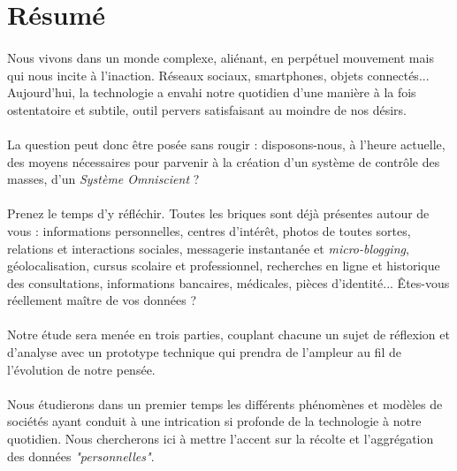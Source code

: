 \section*{Résumé}

\paragraph{} Nous vivons dans un monde complexe, aliénant, en perpétuel mouvement mais qui
nous incite à l'inaction. Réseaux sociaux, smartphones, objets connectés... Aujourd'hui, la
technologie a envahi notre quotidien d'une manière à la fois ostentatoire et subtile, outil
pervers satisfaisant au moindre de nos désirs.

\paragraph{} La question peut donc être posée sans rougir : disposons-nous, à l'heure
actuelle, des moyens nécessaires pour parvenir à la création d'un système de contrôle des
masses, d'un \emph{Système Omniscient} ?

\paragraph{} Prenez le temps d'y réfléchir. Toutes les briques sont déjà présentes autour
de vous : informations personnelles, centres d'intérêt, photos de toutes sortes, relations
et interactions sociales, messagerie instantanée et \emph{micro-blogging}, géolocalisation,
cursus scolaire et professionnel, recherches en ligne et historique des consultations,
informations bancaires, médicales, pièces d'identité... Êtes-vous réellement maître de vos
données ?

\paragraph{} Notre étude sera menée en trois parties, couplant chacune un sujet de réflexion
et d'analyse avec un prototype technique qui prendra de l'ampleur au fil de l'évolution de
notre pensée.

\paragraph{} Nous étudierons dans un premier temps les différents phénomènes et modèles de
sociétés ayant conduit à une intrication si profonde de la technologie à notre quotidien. 
Nous chercherons ici à mettre l'accent sur la récolte et l'aggrégation des données
\emph{"personnelles"}.

